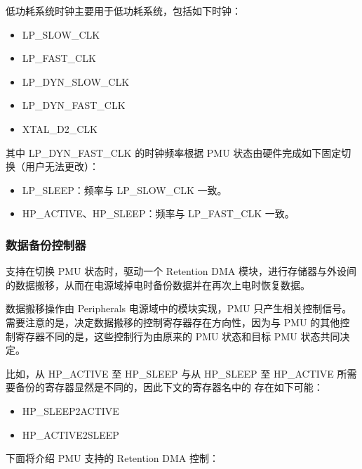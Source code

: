 \documentclass[main\_\_CN.tex]{subfiles}
\begin{document}
低功耗系统时钟主要用于低功耗系统，包括如下时钟：

\begin{itemize}
\item LP\_SLOW\_CLK
\item LP\_FAST\_CLK
\item LP\_DYN\_SLOW\_CLK
\item LP\_DYN\_FAST\_CLK
\item XTAL\_D2\_CLK
\end{itemize}

其中 LP\_DYN\_FAST\_CLK 的时钟频率根据 PMU 状态由硬件完成如下固定切换（用户无法更改）：

\begin{itemize}
\item LP\_SLEEP：频率与 LP\_SLOW\_CLK 一致。
\item HP\_ACTIVE、HP\_SLEEP：频率与 LP\_FAST\_CLK 一致。
\end{itemize}

\subsubsection{数据备份控制器}

\chipname{} 支持在切换 PMU 状态时，驱动一个 Retention DMA 模块，进行存储器与外设间的数据搬移，从而在电源域掉电时备份数据并在再次上电时恢复数据。

数据搬移操作由 Peripherals 电源域中的模块实现，PMU 只产生相关控制信号。需要注意的是，决定数据搬移的控制寄存器存在方向性，因为与 PMU 的其他控制寄存器不同的是，这些控制行为由原来的 PMU 状态和目标 PMU 状态共同决定。

比如，从 HP\_ACTIVE 至 HP\_SLEEP 与从 HP\_SLEEP 至 HP\_ACTIVE 所需要备份的寄存器显然是不同的，因此下文的寄存器名中的  存在如下可能：

\begin{itemize}
\item HP\_SLEEP2ACTIVE
\item HP\_ACTIVE2SLEEP
\end{itemize}

下面将介绍 PMU 支持的 Retention DMA 控制：
\end{document}
